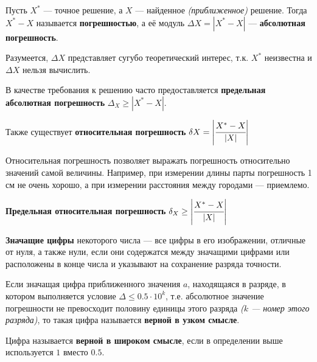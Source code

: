 \begin{definition}
    Пусть \(X^*\) --- точное решение, а \(X\) --- найденное \textit{(приближенное)} решение. Тогда \(X^* - X\) называется \textbf{погрешностью}, а её модуль \(\Delta X = |X^* - X|\) --- \textbf{абсолютная погрешность}.
\end{definition}

Разумеется, \(\Delta X\) представляет сугубо теоретический интерес, т.к. \(X^*\) неизвестна и \(\Delta X\) нельзя вычислить.

\begin{definition}
    В качестве требования к решению часто предоставляется \textbf{предельная абсолютная погрешность} \(\Delta_X \geq |X^* - X|\).
\end{definition}

\begin{definition}
    Также существует \textbf{относительная погрешность} \(\delta X = \left|\cfrac{X^* - X}{|X|}\right|\)
\end{definition}

Относительная погрешность позволяет выражать погрешность относительно значений самой величины. Например, при измерении длины парты погрешность 1 см не очень хорошо, а при измерении расстояния между городами --- приемлемо.

\begin{definition}
    \textbf{Предельная относительная погрешность} \(\delta_X \geq \left|\cfrac{X^* - X}{|X|}\right|\)
\end{definition}

\begin{definition}
    \textbf{Значащие цифры} некоторого числа --- все цифры в его изображении, отличные от нуля, а также нули, если они содержатся между значащими цифрами или расположены в конце числа и указывают на сохранение разряда точности.
\end{definition}

\begin{definition}
    Если значащая цифра приближенного значения \(a\), находящаяся в разряде, в котором выполняется условие \(\Delta \leq 0.5 \cdot 10^k\), т.е. абсолютное значение погрешности не превосходит половину единицы этого разряда \textit{(\(k\) --- номер этого разряда)}, то такая цифра называется \textbf{верной в узком смысле}.

    Цифра называется \textbf{верной в широком смысле}, если в определении выше используется \(1\) вместо \(0.5\).
\end{definition}

